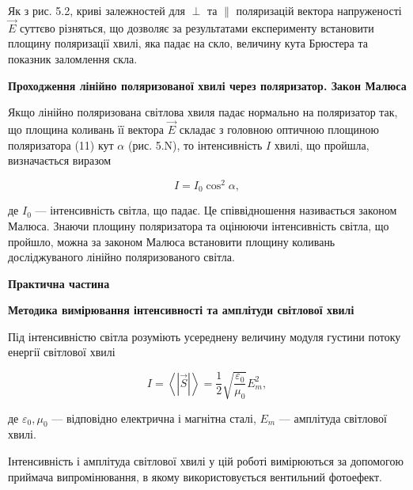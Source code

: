 \documentclass[12pt,a4paper]{article}
\begin{document}
    Як з рис. 5.2, криві залежностей для $\perp$ та $\parallel$ поляризацій вектора напруженості $\vec{E}$
    суттєво різняться, що дозволяє за результатами експерименту встановити площину
    поляризації хвилі, яка падає на скло, величину кута Брюстера та показник заломлення
    скла.

    \begin{center} \textbf{Проходження лінійно поляризованої хвилі через поляризатор. Закон Малюса} \end{center}

    Якщо лінійно поляризована світлова хвиля падає нормально на поляризатор так,
    що площина коливань її вектора $\vec{E}$ складає з головною оптичною площиною
    поляризатора (11) кут $\alpha$ (рис. 5.N),
    то інтенсивність $I$ хвилі, що пройшла, визначається
    виразом

    \begin{equation}
        I = I_0 \cos^2 \alpha,
        \tag{5.2}
    \end{equation}

    де $I_0$ --- інтенсивність світла, що падає. Це співвідношення називається законом Малюса.
    Знаючи площину поляризатора та оцінюючи інтенсивність світла, що пройшло, можна
    за законом Малюса встановити площину коливань досліджуваного лінійно
    поляризованого світла.

    \begin{center} \textbf{\large Практична частина} \end{center}

    \begin{center} \textbf{Методика вимірювання інтенсивності та амплітуди світлової хвилі} \end{center}

    Під інтенсивністю світла розуміють усереднену величину модуля
    густини потоку енергії світлової хвилі

    \begin{equation}
        I = \left\langle \left| \vec{S} \right| \right\rangle = \frac{1}{2} \sqrt{\frac{\varepsilon_0}{\mu_0}}E_m^2,
        \tag{5.3}
    \end{equation}

    де $\varepsilon_0, \mu_0$ --- відповідно електрична і магнітна сталі,
    $E_m$ --- амплітуда світлової хвилі.

    Інтенсивність і амплітуда світлової хвилі у цій роботі вимірюються за допомогою
    приймача випромінювання, в якому використовується вентильний фотоефект.
\end{document}
